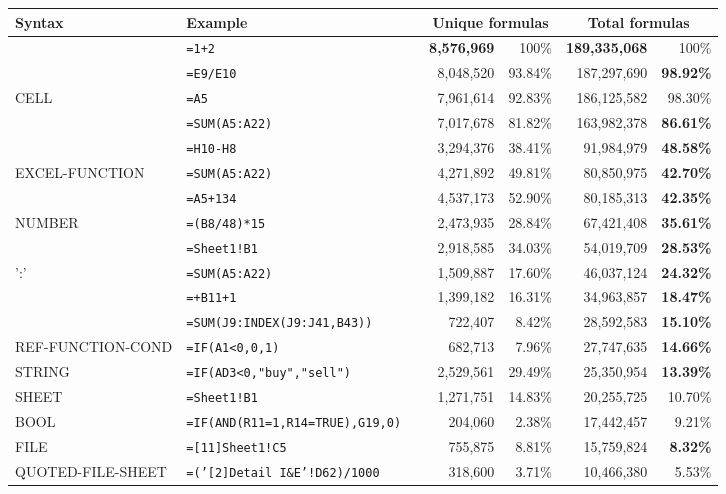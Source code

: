 \begin{tabular}{llrrrrr}
		\hline
		Syntax & Example & &  \multicolumn{2}{c}{Unique formulas} & \multicolumn{2}{c}{Total formulas} \\
		\hline
			\synt{Formula} & \texttt{=1+2} &  & \textbf{8,576,969} & 100\% & \textbf{189,335,068} & 100\%\\
			\synt{Reference} & \texttt{=E9/E10} &  & 8,048,520 & 93.84\% & 187,297,690 & \textbf{98.92\%}\\
			CELL & \texttt{=A5} &  & 7,961,614 & 92.83\% & 186,125,582 & 98.30\%\\
			\synt{FunctionCall} & \texttt{=SUM(A5:A22)} &  & 7,017,678 & 81.82\% & 163,982,378 & \textbf{86.61\%}\\
			\synt{BinOp} & \texttt{=H10-H8} &  & 3,294,376 & 38.41\% & 91,984,979 & \textbf{48.58\%}\\
			EXCEL-FUNCTION & \texttt{=SUM(A5:A22)} &  & 4,271,892 & 49.81\% & 80,850,975 & \textbf{42.70\%}\\
			\synt{Constant} & \texttt{=A5+134} &  & 4,537,173 & 52.90\% & 80,185,313 & \textbf{42.35\%}\\
			NUMBER & \texttt{=(B8/48)*15} &  & 2,473,935 & 28.84\% & 67,421,408 & \textbf{35.61\%}\\
			\synt{Prefix} & \texttt{=Sheet1!B1} &  & 2,918,585 & 34.03\% & 54,019,709 & \textbf{28.53\%}\\
			\synt{Reference} ':' \synt{Reference} & \texttt{=SUM(A5:A22)} &  & 1,509,887 & 17.60\% & 46,037,124 & \textbf{24.32\%}\\
			\synt{UnOpPrefix} & \texttt{=+B11+1} &  & 1,399,182 & 16.31\% & 34,963,857 & \textbf{18.47\%}\\
			\synt{RefFunctionName} & \texttt{=SUM(J9:INDEX(J9:J41,B43))} &  & 722,407 & 8.42\% & 28,592,583 & \textbf{15.10\%}\\
			REF-FUNCTION-COND & \texttt{=IF(A1<0,0,1)} &  & 682,713 & 7.96\% & 27,747,635 & \textbf{14.66\%}\\
			STRING & \texttt{=IF(AD3<0,"buy","sell")} &  & 2,529,561 & 29.49\% & 25,350,954 & \textbf{13.39\%}\\
			SHEET & \texttt{=Sheet1!B1} &  & 1,271,751 & 14.83\% & 20,255,725 & 10.70\%\\
			BOOL & \texttt{=IF(AND(R11=1,R14=TRUE),G19,0)} &  & 204,060 & 2.38\% & 17,442,457 & 9.21\%\\
			FILE & \texttt{=[11]Sheet1!C5} &  & 755,875 & 8.81\% & 15,759,824 & \textbf{8.32\%}\\
			QUOTED-FILE-SHEET & \texttt{=('[2]Detail I\&E'!D62)/1000} &  & 318,600 & 3.71\% & 10,466,380 & 5.53\%\\

\end{tabular}
